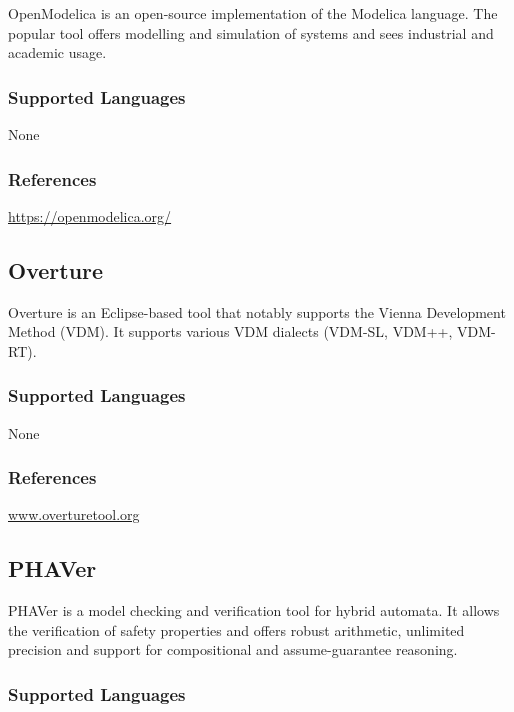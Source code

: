
OpenModelica is an open-source implementation of the Modelica language.
The popular tool offers modelling and simulation of systems and sees industrial and academic usage.
\subsubsection{Supported Languages}

None


\subsubsection{References}

\url{https://openmodelica.org/}


\subsection{Overture}
\label{subsecT:Overture}


Overture is an Eclipse-based tool that notably supports the Vienna Development Method (VDM).
It supports various VDM dialects (VDM-SL, VDM++, VDM-RT). 

\subsubsection{Supported Languages}

None


\subsubsection{References}

\url{www.overturetool.org}



\subsection{PHAVer}
\label{subsecT:PHAVer}


PHAVer is a model checking and verification tool for hybrid automata.
It allows the verification of safety properties and offers robust arithmetic, unlimited precision and support for compositional and assume-guarantee reasoning.

\subsubsection{Supported Languages}

